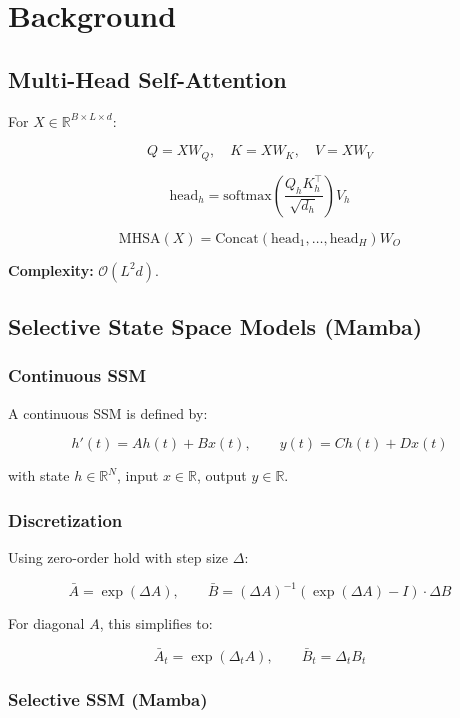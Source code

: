 
\section{Background}

\subsection{Multi-Head Self-Attention}

For $X \in \mathbb{R}^{B \times L \times d}$:

\[
Q = X W_Q, \quad K = X W_K, \quad V = X W_V
\tag{3.1}
\]

\[
\text{head}_h = \text{softmax}\!\left(\frac{Q_h K_h^\top}{\sqrt{d_h}}\right) V_h
\tag{3.2}
\]

\[
\text{MHSA}(X) = \text{Concat}(\text{head}_1, \dots, \text{head}_H) W_O
\tag{3.3}
\]

\textbf{Complexity:} $\mathcal{O}(L^2 d)$.

\subsection{Selective State Space Models (Mamba)}

\subsubsection{Continuous SSM}

A continuous SSM is defined by:

\[
h'(t) = A h(t) + B x(t), \qquad
y(t) = C h(t) + D x(t)
\tag{3.4}
\]

with state $h \in \mathbb{R}^N$, input $x \in \mathbb{R}$, output $y \in \mathbb{R}$.

\subsubsection{Discretization}

Using zero-order hold with step size $\Delta$:

\[
\bar{A} = \exp(\Delta A), \qquad
\bar{B} = (\Delta A)^{-1} (\exp(\Delta A) - I) \cdot \Delta B
\tag{3.5}
\]

For diagonal $A$, this simplifies to:

\[
\bar{A}_t = \exp(\Delta_t A), \qquad
\bar{B}_t = \Delta_t B_t
\tag{3.6}
\]

\subsubsection{Selective SSM (Mamba)}


